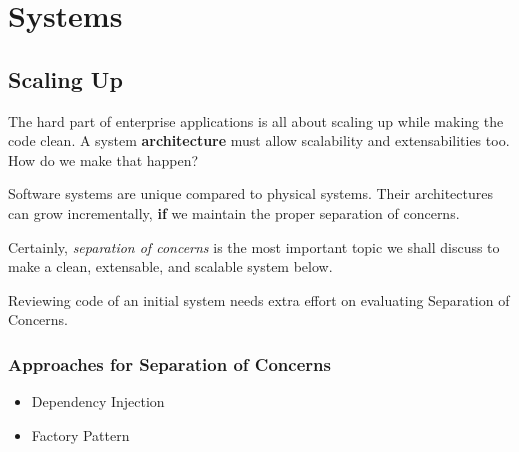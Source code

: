 
\chapter{Systems}

\section{Scaling Up}

The hard part of enterprise applications is all about scaling up while making the code clean. A system \textbf{architecture} must allow scalability and extensabilities too. How do we make that happen?

\begin{tcolorbox}[breakable, colback=green!10!white, colframe=green!85!black]
Software systems are unique compared to physical systems. Their architectures can grow
incrementally, \textbf{if} we maintain the proper separation of concerns.
\end{tcolorbox}

Certainly, \textit{separation of concerns} is the most important topic we shall discuss to make a clean, extensable, and scalable system below.

\begin{marker}
Reviewing code of an initial system needs extra effort on evaluating Separation of Concerns.
\end{marker}

\subsection{Approaches for Separation of Concerns}

\begin{itemize}
    \item Dependency Injection
    \item Factory Pattern
\end{itemize}